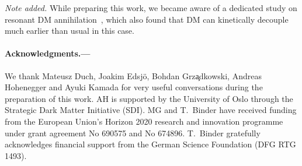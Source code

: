 \documentclass[twocolumn,showpacs,amsmath,amssymb,superscriptaddress,nofootinbib]{revtex4-1}
\begin{document}
\bigskip
{\it Note added.} While preparing this work, we became aware of a dedicated study 
on resonant DM annihilation~\cite{Duch:2017nbe}, which also found that DM
can kinetically decouple much earlier than usual in this case.


\vfill
\paragraph*{Acknowledgments.---}
We thank Mateusz Duch, Joakim Edsj\"o, Bohdan Grz\c{a}dkowski, Andreas Hohenegger
and  Ayuki Kamada for very useful conversations during the preparation of this work. 
AH is supported by the University of Oslo through the Strategic Dark Matter Initiative (SDI). 
MG and T.~Binder have received funding from the European Union’s Horizon 2020 research 
and innovation programme under grant agreement No 690575 and No 674896. T.~Binder 
gratefully acknowledges financial support from the German Science Foundation (DFG RTG 1493).

\appendix
\end{document}
